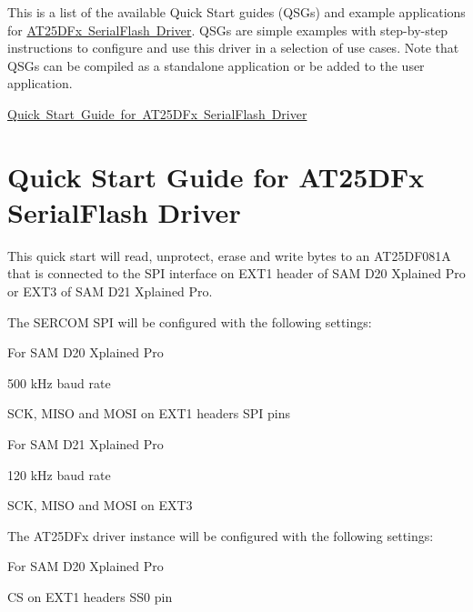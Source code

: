 This is a list of the available Quick Start guides (Q\+S\+Gs) and example applications for \mbox{\hyperlink{group__asfdoc__common2__at25dfx__group}{A\+T25\+D\+Fx Serial\+Flash Driver}}. Q\+S\+Gs are simple examples with step-\/by-\/step instructions to configure and use this driver in a selection of use cases. Note that Q\+S\+Gs can be compiled as a standalone application or be added to the user application.


\begin{DoxyItemize}
\item \mbox{\hyperlink{asfdoc_common2_at25dfx_basic_use}{Quick Start Guide for A\+T25\+D\+Fx Serial\+Flash Driver}} 
\end{DoxyItemize}\hypertarget{asfdoc_common2_at25dfx_basic_use}{}\section{Quick Start Guide for A\+T25\+D\+Fx Serial\+Flash Driver}\label{asfdoc_common2_at25dfx_basic_use}
This quick start will read, unprotect, erase and write bytes to an A\+T25\+D\+F081A that is connected to the S\+PI interface on E\+X\+T1 header of S\+AM D20 Xplained Pro or E\+X\+T3 of S\+AM D21 Xplained Pro.

The S\+E\+R\+C\+OM S\+PI will be configured with the following settings\+:

For S\+AM D20 Xplained Pro
\begin{DoxyItemize}
\item 500 k\+Hz baud rate
\item S\+CK, M\+I\+SO and M\+O\+SI on E\+X\+T1 header\textquotesingle{}s S\+PI pins
\end{DoxyItemize}

For S\+AM D21 Xplained Pro
\begin{DoxyItemize}
\item 120 k\+Hz baud rate
\item S\+CK, M\+I\+SO and M\+O\+SI on E\+X\+T3
\end{DoxyItemize}

The A\+T25\+D\+Fx driver instance will be configured with the following settings\+:

For S\+AM D20 Xplained Pro
\begin{DoxyItemize}
\item CS on E\+X\+T1 header\textquotesingle{}s S\+S0 pin
\end{DoxyItemize}

